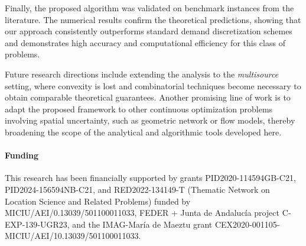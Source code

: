 \documentclass[letter,11pt, reqno]{amsart}
\renewcommand{\;}{\quad}
\theoremstyle{thmstyleone}%
\theoremstyle{thmstyletwo}%
\theoremstyle{thmstylethree}%
\begin{document}
Finally, the proposed algorithm was validated on benchmark instances from the literature. The numerical results confirm the theoretical predictions, showing that our approach consistently outperforms standard demand discretization schemes and demonstrates high accuracy and computational efficiency for this class of problems.

Future research directions include extending the analysis to the \emph{multisource} setting, where convexity is lost and combinatorial techniques become necessary to obtain comparable theoretical guarantees. Another promising line of work is to adapt the proposed framework to other continuous optimization problems involving spatial uncertainty, such as geometric network or flow models, thereby broadening the scope of the analytical and algorithmic tools developed here.

\paragraph{\bf Funding} 
This research has been financially supported by grants PID2020-114594GB-C21, PID2024-156594NB-C21, and RED2022-134149-T (Thematic Network on Location Science and Related Problems) funded by MICIU/AEI/0.13039/501100011033, FEDER + Junta de Andaluc\'ia project C‐EXP‐139‐UGR23, and the IMAG-Mar\'ia de Maeztu grant CEX2020-001105-MICIU/AEI/10.13039/501100011033.

\end{document}
